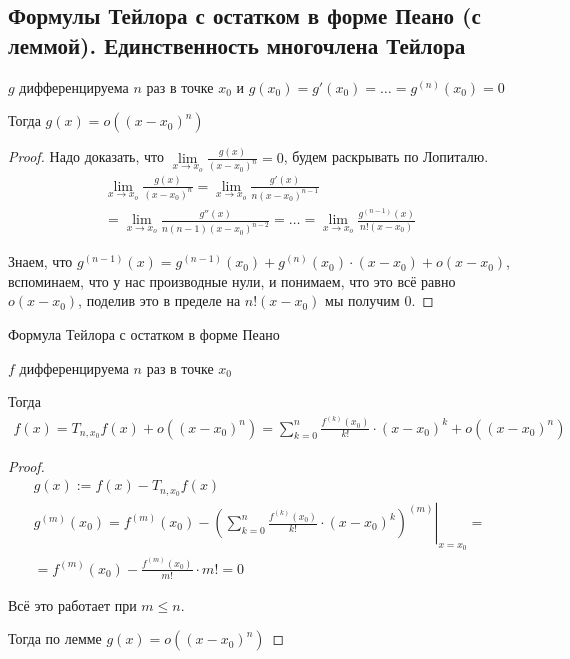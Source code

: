 
\subsection{Формулы Тейлора с остатком в форме Пеано (с леммой). Единственность многочлена Тейлора \href{https://youtu.be/au9-34CerJM?t=4684}{\Walley}}

\begin{lemma}
    
    $g$ дифференцируема $n$ раз в точке $x_0$ и $g(x_0) = g'(x_0) = \dots = g^{(n)}(x_0) = 0$

    Тогда $g(x) = o((x - x_0)^n)$

    \begin{proof}
        
        Надо доказать, что $\lim\limits_{x \to x_o} \frac{g(x)}{(x-x_0)^n} = 0$,
        будем раскрывать по Лопиталю.
        \begin{gather*}
            \lim\limits_{x \to x_o} \frac{g(x)}{(x-x_0)^n} = \lim\limits_{x \to x_o} \frac{g'(x)}{n(x-x_0)^{n-1}} \\ 
            = \lim\limits_{x \to x_o} \frac{g''(x)}{n(n-1)(x-x_0)^{n-2}} = \dots = \lim\limits_{x \to x_o} \frac{g^{(n-1)}(x)}{n!(x-x_0)}
        \end{gather*}

        Знаем, что $g^{(n-1)}(x) = g^{(n-1)}(x_0) + g^{(n)}(x_0) \cdot (x - x_0) + o(x - x_0)$, вспоминаем,
        что у нас производные нули, и понимаем, что это всё равно $o(x - x_0)$, поделив это в пределе на $n!(x-x_0)$ мы получим $0$.

    \end{proof}

\end{lemma}


\begin{theorem-non}
    Формула Тейлора с остатком в форме Пеано

    $f$ дифференцируема $n$ раз в точке $x_0$

    Тогда 
    \begin{gather*}
        f(x) = T_{n, x_0} f(x) + o((x - x_0)^n) = \sum_{k=0}^{n} \frac{f^{(k)}(x_0)}{k!} \cdot (x - x_0)^k + o((x - x_0)^n)
    \end{gather*}

    \begin{proof}

            \begin{gather*}
                g(x) := f(x) - T_{n, x_0} f(x) \\
                g^{(m)}(x_0) = f^{(m)}(x_0) - \left.\left( \sum_{k = 0}^{n} \frac{f^{(k)}(x_0)}{k!} \cdot (x - x_0)^k \right) ^{(m)} \right|_{x = x_0} = \\
                = f^{(m)}(x_0) - \frac{f^{(m)}(x_0)}{m!} \cdot m! = 0
            \end{gather*}

            Всё это работает при $m \leqslant n$.

            Тогда по лемме $g(x) = o((x - x_0)^n)$
    \end{proof}
\end{theorem-non}

